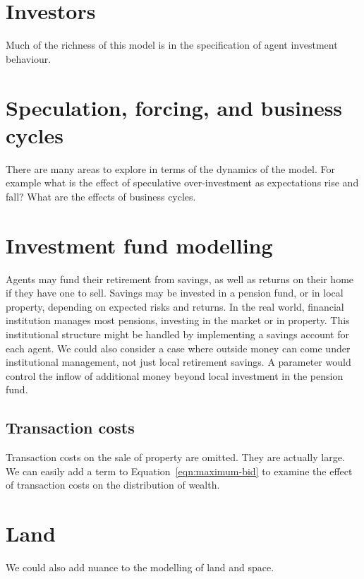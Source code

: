 \section{Investors}

Much of the richness of this model is in the specification of agent investment behaviour. 

\section{Speculation, forcing, and business cycles}
There are many areas to explore in terms of the dynamics of the model. 
For example what is the effect of speculative over-investment as expectations rise and fall? What are the effects of business cycles.  

\section{Investment fund modelling}
Agents may fund their retirement from savings, as well as returns on their home if they have one to sell. Savings may be invested in a pension fund, or in local property,  depending on expected risks and returns. In the real world, financial institution manages most pensions, investing in the market or in property.  This institutional structure might be handled by implementing a savings account for each agent. %
We could also consider a case where outside money can come under institutional management, not just local retirement savings. A parameter would control the inflow of additional money beyond local investment in the pension fund. 

\subsection{Transaction costs}
Transaction costs on the sale of property are omitted. They are actually large. We can easily add a term to  Equation~\ref{eqn:maximum-bid} to examine the effect of transaction costs on the distribution of wealth.



\section{Land}

We could also add nuance to the modelling of land and space.





